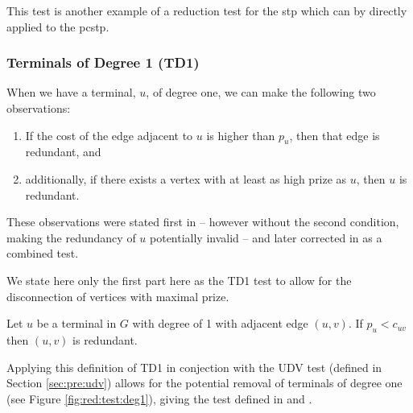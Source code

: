 This test is another example of a reduction test for the \gls{stp} which can by directly applied to
 the \gls{pcstp}.
 \subsubsection{Terminals of Degree 1 (TD1)}\label{sec:pre:td1}
 When we have a terminal, $u$, of degree one, we can make the following two observations:
 \begin{enumerate}
 \item If the cost of the edge adjacent to $u$ is higher than $p_u$, then that edge is redundant, and
 \item additionally, if there exists a vertex with at least as high prize as $u$, then $u$ is redundant.
 \end{enumerate}
 These observations were stated first in \cite{uchoa2006reduction} -- however without the second condition,
 making the redundancy of $u$ potentially invalid -- and later corrected in \cite{rehfeldt2016reduction} as a combined test.

 We state here only the first part here as the TD1 test to allow for the disconnection of vertices with maximal prize.
 \begin{theorem}
   Let $u$ be a terminal in $G$ with degree of 1 with adjacent edge $(u, v)$. If
   $p_u < c_{uv}$ then $(u,v)$ is redundant.
 \end{theorem}

 Applying this definition of TD1 in conjection with the UDV test (defined in Section \ref{sec:pre:udv})
 allows for the potential removal of terminals of degree one (see Figure \ref{fig:red:test:deg1}), giving the
  test defined in \cite{uchoa2006reduction} and \cite{rehfeldt2016reduction}.

